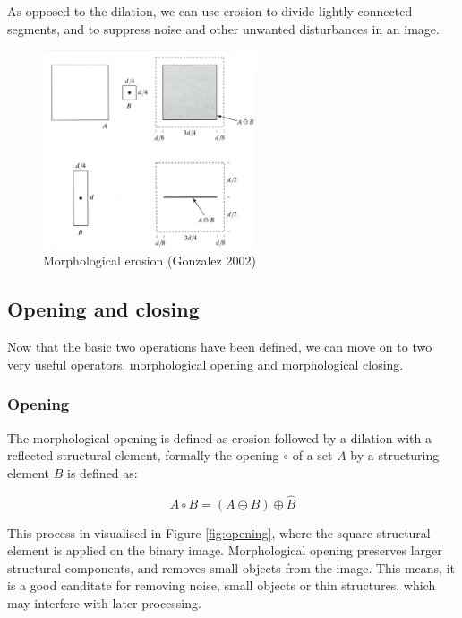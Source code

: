 \documentclass[
  digital,     %
  oneside,     %
  nosansbold,  %
  nocolorbold, %
  lof,         %
  lot,         %
]{fithesis4}
\begin{document}
As opposed to the dilation, we can use erosion to divide lightly connected
segments, and to suppress noise and other unwanted disturbances in an image.

\begin{figure}
    \begin{center}
        \includegraphics[width=6.3cm]{resources/morph_erosion.jpg}
    \end{center}
    \caption{Morphological erosion (Gonzalez 2002)} %
    \label{fig:morph_erosion}
\end{figure}

\subsection{Opening and closing}

Now that the basic two operations have been defined, we can move on to two
very useful operators, morphological opening and morphological closing.

\subsubsection{Opening}

The morphological opening is defined as erosion followed by a dilation with a
reflected structural element, formally the opening $\circ$ of a set $A$ by a structuring
element $B$ is defined as\cite{soile2004}: 

$$A \circ B = (A \ominus B) \oplus \hat{B} $$

This process in visualised in Figure \ref{fig:opening}, where the square
structural element is applied on the binary image. Morphological opening
preserves larger structural components, and removes small objects from the
image. This means, it is a good canditate for removing noise, small objects or
thin structures, which may interfere with later processing.
\end{document}
